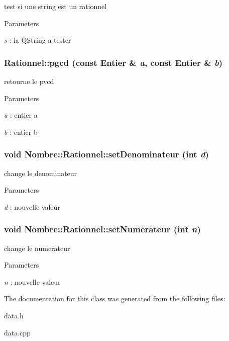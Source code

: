 test si une string est un rationnel 


\begin{DoxyParams}{Parameters}
\item[{\em s}]: la QString a tester \end{DoxyParams}
\hypertarget{classNombre_1_1Rationnel_a887d49ae935aa401e0dcce5c8534b894}{
\subsubsection[{pgcd}]{ Rationnel::pgcd (const {\bf Entier} \& {\em a}, \/  const {\bf Entier} \& {\em b})}}
\label{classNombre_1_1Rationnel_a887d49ae935aa401e0dcce5c8534b894}


retourne le pvcd 


\begin{DoxyParams}{Parameters}
\item[{\em a}]: entier a \item[{\em b}]: entier b \end{DoxyParams}
\hypertarget{classNombre_1_1Rationnel_abe4d3136a4e1aa0d76575602d6e4630f}{
\subsubsection[{setDenominateur}]{\setlength{\rightskip}{0pt plus 5cm}void Nombre::Rationnel::setDenominateur (int {\em d})}}
\label{classNombre_1_1Rationnel_abe4d3136a4e1aa0d76575602d6e4630f}


change le denominateur 


\begin{DoxyParams}{Parameters}
\item[{\em d}]: nouvelle valeur \end{DoxyParams}
\hypertarget{classNombre_1_1Rationnel_a18c8f925fd5d353e8b985c9ea725fb70}{
\subsubsection[{setNumerateur}]{\setlength{\rightskip}{0pt plus 5cm}void Nombre::Rationnel::setNumerateur (int {\em n})}}
\label{classNombre_1_1Rationnel_a18c8f925fd5d353e8b985c9ea725fb70}


change le numerateur 


\begin{DoxyParams}{Parameters}
\item[{\em n}]: nouvelle valeur \end{DoxyParams}


The documentation for this class was generated from the following files:\begin{DoxyCompactItemize}
\item 
data.h\item 
data.cpp\end{DoxyCompactItemize}

